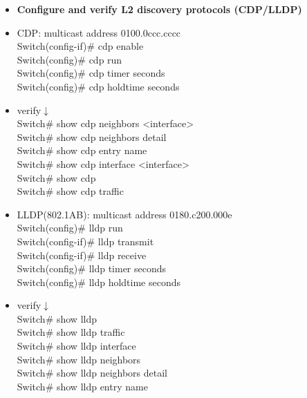 \documentclass{article}
\begin{document}
\begin{itemize}
  \item \textbf{Configure and verify L2 discovery protocols (CDP/LLDP)}
  	\item[] CDP: multicast address 0100.0ccc.cccc\\
  		Switch(config-if)\# cdp enable\\
  		Switch(config)\# cdp run\\
  		Switch(config)\# cdp timer seconds\\
  		Switch(config)\# cdp holdtime seconds
  	\item[] verify$\downarrow$\\
  		Switch\# show cdp neighbors \textless interface\textgreater\\
  		Switch\# show cdp neighbors detail\\
  		Switch\# show cdp entry name\\
  		Switch\# show cdp interface \textless interface\textgreater\\
  		Switch\# show cdp\\
  		Switch\# show cdp traffic
  	\item[] LLDP(802.1AB): multicast address 0180.c200.000e\\
  		Switch(config)\# lldp run\\
  		Switch(config-if)\# lldp transmit\\
  		Switch(config-if)\# lldp receive\\
  		Switch(config)\# lldp timer seconds\\
  		Switch(config)\# lldp holdtime seconds
  	\item verify$\downarrow$\\
  		Switch\# show lldp\\
  		Switch\# show lldp traffic\\
  		Switch\# show lldp interface\\
  		Switch\# show lldp neighbors\\
  		Switch\# show lldp neighbors detail\\
  		Switch\# show lldp entry name
  		

\end{itemize}
\end{document}
